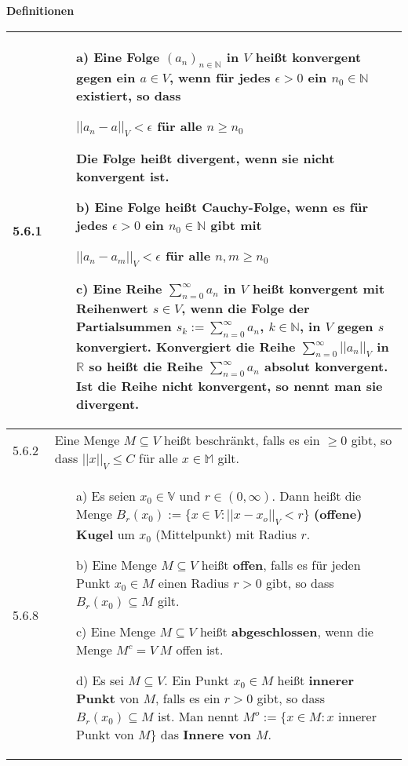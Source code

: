 \noindent
\textbf{Definitionen}
\begin{table}[H]  
\begin{tabularx}{\textwidth}{X m{16cm}}
    \toprule

    5.6.1 & \begin{itemize}[topsep=-0.5cm]
                \item[a)] Eine Folge $(a_n)_{n \in \mathbb{N}}$ in $V$ heißt \textbf{konvergent} gegen ein $a \in V$, wenn
                            für jedes $\epsilon > 0$ ein $n_0 \in \mathbb{N}$ existiert, so dass \hfill \break
                            \centerline{$||a_n - a||_V < \epsilon$ für alle $n \geq n_0$}
                            Die Folge heißt \textbf{divergent,} wenn sie nicht konvergent ist.
                \item[b)] Eine Folge heißt \textbf{Cauchy-Folge}, wenn es für jedes $\epsilon > 0$ ein $n_0 \in \mathbb{N}$ gibt
                            mit \hfill \break
                            \centerline{$||a_n - a_m||_V < \epsilon$ für alle $n,m \geq n_0$}
                \item[c)] Eine Reihe $\sum^{\infty}_{n=0} a_n$ in $V$ heißt \textbf{konvergent} mit Reihenwert $s \in V$, wenn die
                            Folge der Partialsummen $s_k := \sum^{\infty}_{n=0} a_n$, $k \in \mathbb{N}$, in $V$ gegen $s$ konvergiert. \hfill \break
                            Konvergiert die Reihe $\sum^{\infty}_{n=0} ||a_n||_V$ in $\mathbb{R}$ so heißt die Reihe
                            $\sum^{\infty}_{n=0}a_n$ \textbf{absolut konvergent}. \hfill \break
                            Ist die Reihe nicht konvergent, so nennt man sie \textbf{divergent}.
            \end{itemize} \vspace{-0cm} \\
    \midrule
    5.6.2 & Eine Menge $M \subseteq V$ hei\ss t beschränkt, falls es ein $ \geq 0$ gibt, so dass $||x||_V \leq C$ für alle 
            $x \in \mathbb{M}$ gilt. \\
    \midrule
    5.6.8 & \begin{itemize}[topsep=-0.5cm]
                \item[a)] Es seien $x_0 \in \mathbb{V}$ und $r \in (0, \infty)$. Dann heißt die Menge \hfill \break
                            $B_r(x_0) := \{x \in V: ||x-x_o||_V < r\} $ \textbf{(offene) Kugel} um $x_0$ (Mittelpunkt) mit Radius $r$.
                \item[b)] Eine Menge $M \subseteq V$ heißt \textbf{offen}, falls es für jeden Punkt $x_0 \in M$ einen Radius
                            $r > 0$ gibt, so dass $B_r(x_0) \subseteq M$ gilt.
                \item[c)] Eine Menge $M \subseteq V$ heißt \textbf{abgeschlossen}, wenn die Menge $M^c = V \ M$ offen ist.
                \item[d)] Es sei $M \subseteq V$. Ein Punkt $x_0 \in M$ heißt \textbf{innerer Punkt} von $M$, falls es ein
                            $r > 0$ gibt, so dass $B_r(x_0) \subseteq M$ ist. \hfill \break 
                            Man nennt $M^o := \{x \in M: x$ innerer Punkt von $M$\} das \textbf{Innere von $M$}.    
                              

\end{itemize}
\end{tabularx}
\end{table}
